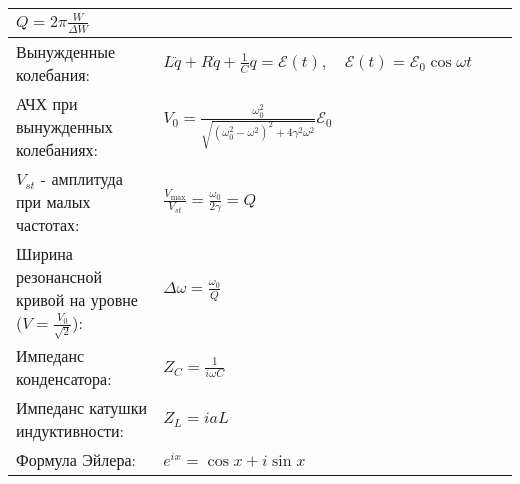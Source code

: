 \documentclass{article}
\begin{document}
\begin{tabular}{ |p{6cm}|p{3cm}|p{6cm}|p{3.5cm}|  }
$Q=2 \pi \frac{W}{\Delta W}$                                               &
                                                                           &
                                                                           \\
\hline
Вынужденные колебания:                                                     &
$L \ddot{q}+R \dot{q}+\frac{1}{C} q=\mathcal{E}(t), \quad \mathcal{E}(t)=\mathcal{E}_{0} \cos \omega t$&
                                                                           &
                                                                           \\
\hline
АЧХ при вынужденных колебаниях:                                            &
$V_{0}=\frac{\omega_{0}^{2}}{\sqrt{\left(\omega_{0}^{2}-\omega^{2}\right)^{2}+4 \gamma^{2} \omega^{2}}} \mathcal{E}_{0}$&
                                                                           &
                                                                           \\
\hline
$V_{st}$ - амплитуда при малых частотах:                                   &
$\frac{V_{\max }}{V_{st}}=\frac{\omega_{0}}{2 \gamma}=Q$                   &
                                                                           &
                                                                           \\
\hline
Ширина резонансной кривой на уровне ($V = \frac{V_0}{\sqrt{2}}$):          &
$\Delta \omega=\frac{\omega_{0}}{Q}$                                       &
                                                                           &
                                                                           \\
\hline
Импеданс конденсатора:                                                     &
$Z_C = \frac{1}{i \omega C}$                                               &
                                                                           &
                                                                           \\
\hline
Импеданс катушки индуктивности:                                            &
$Z_L = i a L$                                                              &
                                                                           &
                                                                           \\
\hline
Формула Эйлера:                                                            &
$e^{i x}=\cos x+i \sin x$                                                  &

\end{tabular}
\end{document}
